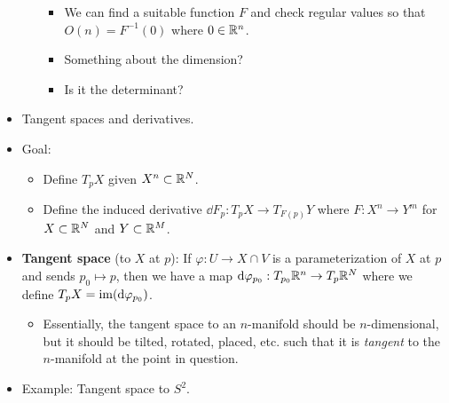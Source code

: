 \documentclass[../notes.tex]{subfiles}
\begin{document}
\begin{itemize}
\begin{enumerate}
        \begin{itemize}
            \item We can find a suitable function $F$ and check regular values so that $O(n)=F^{-1}(0)$ where $0\in\mathbb{R}^n$.
            \item Something about the dimension?
            \item Is it the determinant?
        \end{itemize}
    \end{enumerate}
    \item Tangent spaces and derivatives.
    \item Goal:
    \begin{itemize}
        \item Define $T_pX$ given $X^n\subset\mathbb{R}^N$.
        \item Define the induced derivative $\dd{F_p}:T_pX\to T_{F(p)}Y$ where $F:X^n\to Y^m$ for $X\subset\mathbb{R}^N$ and $Y\subset\mathbb{R}^M$.
    \end{itemize}
    \item \textbf{Tangent space} (to $X$ at $p$): If $\varphi:U\to X\cap V$ is a parameterization of $X$ at $p$ and sends $p_0\mapsto p$, then we have a map $\dd\varphi_{p_0}:T_{p_0}\mathbb{R}^n\to T_p\mathbb{R}^N$ where we define $T_pX=\operatorname{im}(\dd\varphi_{p_0})$.
    \begin{itemize}
        \item Essentially, the tangent space to an $n$-manifold should be $n$-dimensional, but it should be tilted, rotated, placed, etc. such that it is \emph{tangent} to the $n$-manifold at the point in question.
    \end{itemize}
    \item Example: Tangent space to $S^2$.
    \begin{figure}[h!]
        \centering
\end{figure}
\end{itemize}
\end{document}
